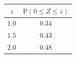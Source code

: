 {\setlength{\tabcolsep}{5pt}\renewcommand{\arraystretch}{1.25}%
\begin{tabular}{|c|c|}
\hline
$z$ & $\mathrm{P}(0\le Z\le z)$ \\
\hline
$1.0$ & $0.34$ \\
\hline
$1.5$ & $0.43$ \\
\hline
$2.0$ & $0.48$ \\
\hline
\end{tabular}}
